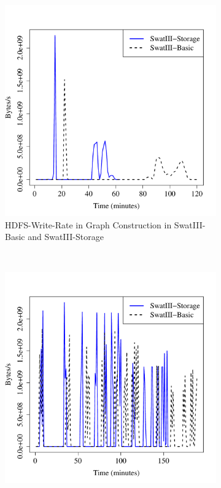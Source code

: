 \documentclass[conference]{IEEEtran}
\begin{document}
\begin{figure}[htb]
\begin{subfigure}[b]{0.3\textwidth}
                \includegraphics[width=\textwidth]{Figure/SystemData/Plots/BGHddSsdHdfsWrIops.pdf}
                \caption{HDFS-Write-Rate in Graph Construction in SwatIII-Basic and SwatIII-Storage}
                \label{fig:BGHddSsdHdfsWrIops}
        \end{subfigure}
        ~ %
        \begin{subfigure}[b]{0.3\textwidth}
                \includegraphics[width=\textwidth]{Figure/SystemData/Plots/ECHddSsdHdfsWrIops.pdf}

\end{subfigure}
\end{figure}
\end{document}
